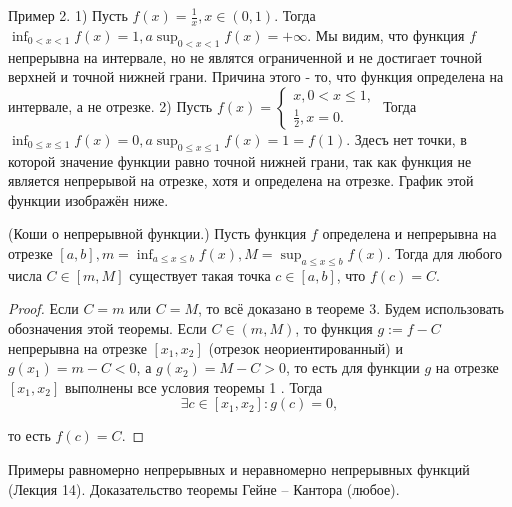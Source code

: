 Пример 2. 1) Пусть $f(x)=\frac{1}{x}, x \in(0,1)$. Тогда $\inf _{0<x<1} f(x)=1, a \sup _{0<x<1} f(x)=+\infty$. Мы видим, что функция $f$ непрерывна на интервале, но не являтся ограниченной и не достигает точной верхней и точной нижней грани. Причина этого - то, что функция определена на интервале, а не отрезке.
2) Пусть $f(x)=\left\{\begin{array}{l}x, 0<x \leq 1, \\ \frac{1}{2}, x=0 .\end{array}\right.$ Тогда $\inf _{0 \leq x \leq 1} f(x)=0, a \sup _{0 \leq x \leq 1} f(x)=1=f(1)$. Здесъ нет точки, в которой значение функции равно точной нижней грани, так как функция не является непрерывой на отрезке, хотя и определена на отрезке. График этой функции изображён ниже.
\begin{theorem}
    (Коши о непрерывной функции.) Пусть функция $f$ определена и непрерывна на отрезке $[a, b], m=\inf _{a \leq x \leq b} f(x), M=\sup _{a \leq x \leq b} f(x)$. Тогда для любого числа $C \in[m, M]$ существует такая точка $c \in[a, b]$, что $f(c)=C$.
\end{theorem}

\begin{proof}
    Если $C=m$ или $C=M$, то всё доказано в теореме 3. Будем использовать обозначения этой теоремы. Если $C \in(m, M)$, то функция $g:=f-C$ непрерывна на отрезке $\left[x_1, x_2\right]$ (отрезок неориентированный) и $g\left(x_1\right)=m-C<0$, а $g\left(x_2\right)=M-C>0$, то есть для функции $g$ на отрезке $\left[x_1, x_2\right]$ выполнены все условия теоремы 1 . Тогда
    $$
        \exists c \in\left[x_1, x_2\right]: g(c)=0,
    $$

    то есть $f(c)=C$.
\end{proof}

\newpage

\begin{problem}
Примеры равномерно непрерывных и неравномерно непрерывных функций (Лекция
14). Доказательство теоремы Гейне – Кантора (любое).
\end{problem}

